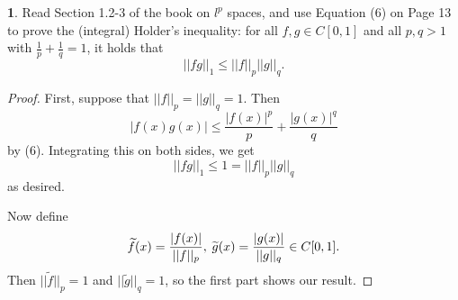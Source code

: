 \documentclass[12pt]{article}
\theoremstyle{definition}
\newtheorem{ex}{}
\begin{document}
\begin{ex}
	Read Section 1.2-3 of the book on $l^p$ spaces, and use Equation (6) on Page 13 to prove the (integral) Holder's inequality: for all $f, g \in C[0, 1]$ and all $p, q > 1$ with $\frac{1}{p} + \frac{1}{q} = 1$, it holds that \begin{equation*}
		||fg||_1 \leq ||f||_p||g||_q.
	\end{equation*}
\end{ex}
\begin{proof}
	First, suppose that $||f||_p = ||g||_q = 1$.
	Then \begin{equation*}
		|f(x)g(x)| \leq \frac{|f(x)|^p}{p} + \frac{|g(x)|^q}{q}
	\end{equation*}
	by (6).
	Integrating this on both sides, we get \begin{equation*}
		||fg||_1 \leq 1 = ||f||_p ||g||_q
	\end{equation*}
	as desired.

	Now define \begin{equation*}
		\widetilde{f}(x) = \frac{|f(x)|}{||f||_p},\hspace{0.25em}\widetilde{g}(x) = \frac{|g(x)|}{||g||_q} \in C[0,1].
	\end{equation*}
	Then $||\widetilde{f}||_p = 1$ and $||\widetilde{g}||_q = 1$, so the first part shows our result.
\end{proof}
\end{document}
